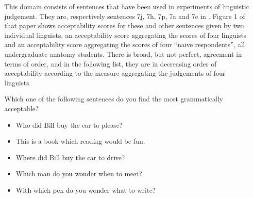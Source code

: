 
This domain consists of sentences that have been used in experiments of linguistic judgement.
They are, respectively sentences 7j, 7h, 7p, 7a and 7e in .
Figure 1 of that paper shows acceptability scores for these and other sentences given by two individual linguists, an acceptability score aggregating the scores of four linguists and an acceptability score aggregating the scores of four ``naive respondents'', all undergraduate anatomy students.
There is broad, but not perfect, agreement in terms of order, and in the following list, they are in decreasing order of acceptability according to the measure aggregating the judgements of four linguists.

\begin{tcolorbox}
Which one of the following sentences do you find the most grammatically acceptable?

\begin{itemize}
	\setlength\itemsep{-5pt}
	\item Who did Bill buy the car to please?
	\item This is a book which reading would be fun.
	\item Where did Bill buy the car to drive?
	\item Which man do you wonder when to meet?
	\item With which pen do you wonder what to write?
\end{itemize}
\end{tcolorbox}
